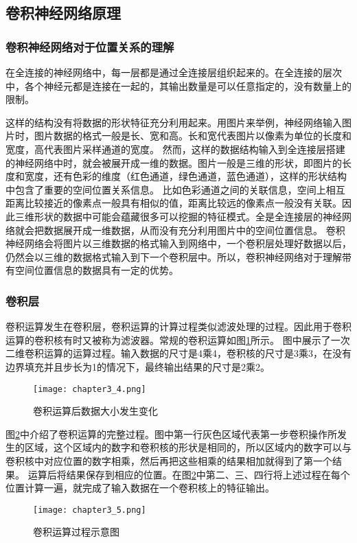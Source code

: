 \subsection{卷积神经网络原理} 
\subsubsection{卷积神经网络对于位置关系的理解}
在全连接的神经网络中，每一层都是通过全连接层组织起来的。在全连接的层次中，各个神经元都是连接在一起的，其输出数量是可以任意指定的，没有数量上的限制。

这样的结构没有将数据的形状特征充分利用起来。用图片来举例，神经网络输入图片时，图片数据的格式一般是长、宽和高。长和宽代表图片以像素为单位的长度和宽度，高代表图片采样通道的宽度。
然而，这样的数据结构输入到全连接层搭建的神经网络中时，就会被展开成一维的数据。图片一般是三维的形状，即图片的长度和宽度，还有色彩的维度（红色通道，绿色通道，蓝色通道），这样的形状结构中包含了重要的空间位置关系信息。
比如色彩通道之间的关联信息，空间上相互距离比较接近的像素点一般具有相似的值，距离比较远的像素点一般没有关联。因此三维形状的数据中可能会蕴藏很多可以挖掘的特征模式。全是全连接层的神经网络就会把数据展开成一维数据，从而没有充分利用图片中的空间位置信息。
卷积神经网络会将图片以三维数据的格式输入到网络中，一个卷积层处理好数据以后，仍然会以三维的数据格式输入到下一个卷积层中。所以，卷积神经网络对于理解带有空间位置信息的数据具有一定的优势。

\subsubsection{卷积层}
卷积运算发生在卷积层，卷积运算的计算过程类似滤波处理的过程。因此用于卷积运算的卷积核有时又被称为滤波器。常规的卷积运算如图\ref{fig:chapter3_4}所示。
图中展示了一次二维卷积运算的运算过程。输入数据的尺寸是4乘4，卷积核的尺寸是3乘3，在没有边界填充并且步长为1的情况下，最终输出结果的尺寸是2乘2。
\begin{figure}
    \centering
    \texttt{[image: chapter3\_4.png]}
    \caption{卷积运算后数据大小发生变化}
    \label{fig:chapter3_4}
\end{figure}

图\ref{fig:chapter3_5}中介绍了卷积运算的完整过程。图中第一行灰色区域代表第一步卷积操作所发生的区域，这个区域内的数字和卷积核的形状是相同的，所以区域内的数字可以与卷积核中对应位置的数字相乘，然后再把这些相乘的结果相加就得到了第一个结果。
运算后将结果保存到相应的位置。在图\ref{fig:chapter3_5}中第二、三、四行将上述过程在每个位置计算一遍，就完成了输入数据在一个卷积核上的特征输出。
\begin{figure}
    \centering
    \texttt{[image: chapter3\_5.png]}
    \caption{卷积运算过程示意图}
    \label{fig:chapter3_5}
\end{figure}

